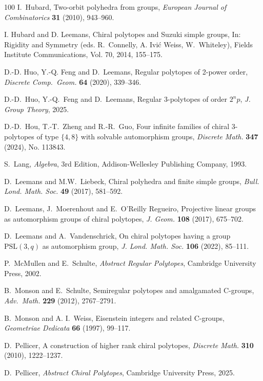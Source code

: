 \documentclass[12pt]{article}
\theoremstyle{definition}\newtheorem{definition}{Definition}[section]
\begin{document}
\begin{thebibliography}{100}
I.~Hubard, Two-orbit polyhedra from groups, \textit{European Journal of Combinatorics} {\bf 31} (2010), 943--960.

I. Hubard and D. Leemans, Chiral polytopes and Suzuki simple groups, In: Rigidity and Symmetry (eds. R.~Connelly, A. Ivić Weiss, W.~Whiteley), Fields Institute Communications,  Vol. 70, 2014, 155--175.

  D.-D. Huo, Y.-Q. Feng  and D.~Leemans, Regular polytopes of 2-power order, \textit{Discrete Comp.\ Geom.} {\bf 64} (2020), 339--346.

D.-D.~Huo, Y.-Q.~Feng and D.~Leemans, Regular 3-polytopes of order $2^{n}p$, \textit{J. Group Theory}, 2025.

D.-D.~Hou, T.-T.~Zheng and R.-R.~Guo, Four infinite families of chiral 3-polytopes of type $\{4, 8\}$ with solvable automorphism groups, \textit{Discrete Math.} {\bf 347} (2024), No. 113843.

S.~Lang, \textit{Algebra}, 3rd Edition, Addison-Wellesley Publishing Company, 1993.

D.~Leemans and M.W.~Liebeck, Chiral polyhedra and finite simple groups, \textit{Bull. Lond. Math. Soc.} {\bf 49} (2017), 581--592.

D.~Leemans, J.~Moerenhout and E.~O’Reilly Regueiro, Projective linear groups as automorphism groups of chiral polytopes, \textit{J. Geom.} {\bf 108} (2017), 675--702.

 D.~Leemans and A.~Vandenschrick, On chiral polytopes having a group $\textrm{PSL}(3, q)$ as automorphism group, \textit{J. Lond. Math. Soc.} {\bf 106} (2022), 85--111.

P.~McMullen and E.~Schulte, \textit{Abstract Regular Polytopes}, Cambridge University Press, 2002.

B.~Monson and E.~Schulte, Semiregular polytopes and amalgamated C-groups, \textit{Adv.\ Math.} {\bf 229} (2012), 2767--2791.

B.~Monson and A. I.~Weiss, Eisenstein integers and related C-groups, \textit{Geometriae Dedicata} {\bf 66} (1997), 99--117.

D.~Pellicer, A construction of higher rank chiral polytopes, \textit{Discrete Math.}
{\bf 310} (2010), 1222--1237.

D.~Pellicer, \textit{Abstract Chiral Polytopes}, Cambridge University Press, 2025.


\end{thebibliography}
\end{document}
